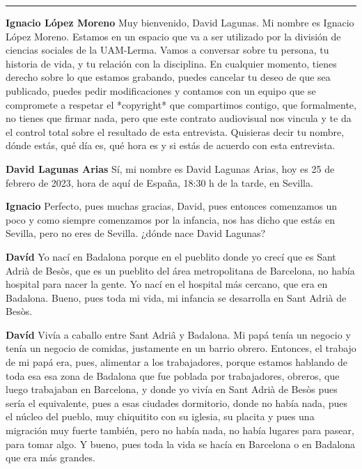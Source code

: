 \documentclass[
  spanish,
  11pt,
  a4paper,
]{scrbook}
\newenvironment{transcripcion}{
    \begin{list}{}{
        \setlength{\leftmargin}{1.5em}  %
        \setlength{\rightmargin}{0em}
        \setlength{\itemsep}{0.2em}     %
        \setlength{\parsep}{0.0em}
        \setlength{\listparindent}{0pt}
    }
}{
    \end{list}
}
\newcommand{\personaje}[1]{\textbf{#1}\quad}
\begin{document}
\endgroup

\begin{center}\rule{0.5\linewidth}{0.5pt}\end{center}

\begin{transcripcion}

\item \personaje{Ignacio López Moreno} Muy bienvenido, David Lagunas. Mi nombre es Ignacio López Moreno. Estamos en un espacio que va a ser utilizado por la división de ciencias sociales de la UAM-Lerma. Vamos a conversar sobre tu persona, tu historia de vida, y tu relación con la disciplina. En cualquier momento, tienes derecho sobre lo que estamos grabando, puedes cancelar tu deseo de que sea publicado, puedes pedir modificaciones y contamos con un equipo que se compromete a respetar el *copyright* que compartimos contigo, que formalmente, no tienes que firmar nada, pero que este contrato audiovisual nos vincula y te da el control total sobre el resultado de esta entrevista. Quisieras decir tu nombre, dónde estás, qué día es, qué hora es y si estás de acuerdo con esta entrevista.

\item \personaje{David Lagunas Arias} Sí, mi nombre es David Lagunas Arias, hoy es 25 de febrero de 2023, hora de aquí de España, 18:30 h de la tarde, en Sevilla.

\item \personaje{Ignacio} Perfecto, pues muchas gracias, David, pues entonces comenzamos un poco y como siempre comenzamos por la infancia, nos has dicho que estás en Sevilla, pero no eres de Sevilla. ¿dónde nace David Lagunas?

\item \personaje{Davíd} Yo nací en Badalona porque en el pueblito donde yo crecí que es Sant Adrià de Besòs, que es un pueblito del área metropolitana de Barcelona, no había hospital para nacer la gente. Yo nací en el hospital más cercano, que era en Badalona. Bueno, pues toda mi vida, mi infancia se desarrolla en Sant Adrià de Besòs.

\item \personaje{Davíd} Vivía a caballo entre Sant Adriâ y Badalona. Mi papá tenía un negocio y tenía un negocio de comidas, justamente en un barrio obrero. Entonces, el trabajo de mi papá era, pues, alimentar a los trabajadores, porque estamos hablando de toda esa esa zona de Badalona que fue poblada por trabajadores, obreros, que luego trabajaban en Barcelona, y donde yo vivía en Sant Adrià de Besòs pues sería el equivalente, pues a esas ciudades dormitorio, donde no había nada, pues el núcleo del pueblo, muy chiquitito con su iglesia, su placita y pues una migración muy fuerte también, pero no había nada, no había lugares para pasear, para tomar algo. Y bueno, pues toda la vida se hacía en Barcelona o en Badalona que era más grandes.


\end{transcripcion}
\end{document}
